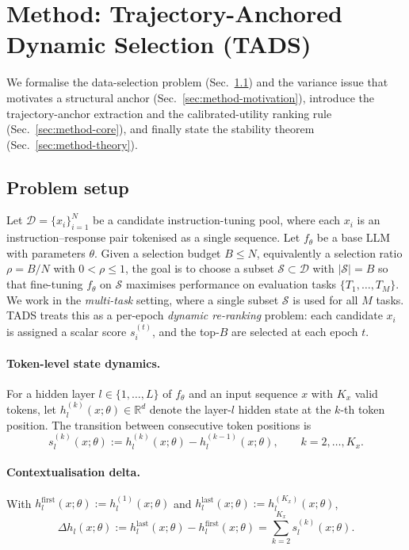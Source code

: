\section{Method: Trajectory-Anchored Dynamic Selection (TADS)}
\label{sec:method}

We formalise the data-selection problem
(Sec.~\ref{sec:problem-setup}) and the variance issue that motivates
a structural anchor (Sec.~\ref{sec:method-motivation}), introduce
the trajectory-anchor extraction and the calibrated-utility ranking
rule (Sec.~\ref{sec:method-core}), and finally state the stability
theorem (Sec.~\ref{sec:method-theory}).


\subsection{Problem setup}
\label{sec:problem-setup}

Let $\mathcal{D}=\{x_i\}_{i=1}^N$ be a candidate instruction-tuning
pool, where each $x_i$ is an instruction--response pair tokenised
as a single sequence. Let $f_\theta$ be a base LLM with parameters
$\theta$. Given a selection budget $B \le N$, equivalently a
selection ratio $\rho=B/N$ with $0<\rho\le1$, the goal is to choose
a subset $\mathcal{S}\subset\mathcal{D}$ with $|\mathcal{S}|=B$ so
that fine-tuning $f_\theta$ on $\mathcal{S}$ maximises performance
on evaluation tasks $\{T_1,\ldots,T_M\}$. We work in the
\emph{multi-task} setting, where a single subset $\mathcal{S}$ is
used for all $M$ tasks. \textsc{TADS} treats this as a per-epoch
\emph{dynamic re-ranking} problem: each candidate $x_i$ is assigned
a scalar score $s_i^{(t)}$, and the top-$B$ are selected at each
epoch $t$.

\paragraph{Token-level state dynamics.}
For a hidden layer $l \in \{1,\ldots,L\}$ of $f_\theta$ and an
input sequence $x$ with $K_x$ valid tokens, let
$h_l^{(k)}(x;\theta)\in\mathbb{R}^d$ denote the layer-$l$ hidden
state at the $k$-th token position. The transition between
consecutive token positions is
\begin{equation}
  s_l^{(k)}(x;\theta) := h_l^{(k)}(x;\theta)-h_l^{(k-1)}(x;\theta),
  \qquad k=2,\ldots,K_x .
  \label{eq:transition}
\end{equation}

\paragraph{Contextualisation delta.}
With $h_l^{\mathrm{first}}(x;\theta) := h_l^{(1)}(x;\theta)$ and
$h_l^{\mathrm{last}}(x;\theta) := h_l^{(K_x)}(x;\theta)$,
\begin{equation}
  \Delta h_l(x;\theta) :=
  h_l^{\mathrm{last}}(x;\theta) - h_l^{\mathrm{first}}(x;\theta)
  = \sum_{k=2}^{K_x} s_l^{(k)}(x;\theta).
  \label{eq:delta}
\end{equation}

